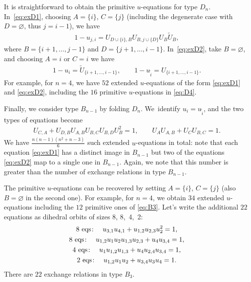 \documentclass[pdftex]{sigma}%
\numberwithin{equation}{section}
\begin{document}
It is straightforward to obtain the primitive $u$-equations for type $D_n$. In~\eqref{eq:exD1}, choosing $A=\{i\}$, $C=\{j\}$ (including the degenerate case with $D=\varnothing$, thus $j=i{-}1$), we have
\begin{gather*}
1-u_{j,i}=U_{D\cup \{i\}, B} U_{B, j\cup \{D\}} U_B \tilde {U}_B,
\end{gather*}
where $B=\{i{+}1, \dots, j{-}1\}$ and $D=\{j{+}1, \dots, i{-}1\}$. In~\eqref{eq:exD2}, take $B=\varnothing$, and choosing $A=i$ or $C=i$ we have
\begin{gather*}
1-u_i=\tilde{U}_{\{i{+}1, \dots, i{-}1\}},\qquad
1-{u}_{\tilde i}=U_{\{i{+}1, \dots, i{-}1\}}.
\end{gather*}
For example, for $n=4$, we have $52$ extended $u$-equations of the form \eqref{eq:exD1} and \eqref{eq:exD2}, including the $16$ primitive $u$-equations in \eqref{eq:D4}.

\medskip{}
Finally, we consider type $B_{n{-}1}$ by folding $D_n$. We~identify $u_i=u_{\tilde i}$, and the two types of equations become
\begin{gather*}%
U_{C,A}+U_{D,B} U_{A,B} U_{B,C} U_{B,D} U_B^2=1, \qquad
U_A U_{A,B}+U_C U_{B,C}=1.
\end{gather*}
We have $\frac{n(n{-}1)(n^2+n-3)}{6}$ such extended $u$-equations in total: note that each equation \eqref{eq:exD1} has a distinct image in $B_{n{-}1}$ but two of the equations \eqref{eq:exD2} map to a single one in $B_{n{-}1}$. Again, we note that this number is greater than the number of exchange relations in type $B_{n{-}1}$.

The primitive $u$-equations can be recovered by setting $A=\{i\}$, $C=\{j\}$ (also $B=\varnothing$ in the second one). For example, for $n=4$, we obtain $34$ extended $u$-equations including the $12$ primitive ones of \eqref{eq:B3}. Let's write the additional $22$ equations as dihedral orbits of sizes 8, 8,~4,~2:
\begin{gather*}
8~{\rm eqs}\colon \quad u_{3,1} u_{4,1}+u_{1,2} u_{2,3} u_2^2=1,%
\\
8~{\rm eqs}\colon \quad u_{1,2} u_1 u_2 u_{1,3} u_{2,3}+u_4 u_{3,4}=1,%
\\
4~{\rm eqs}\colon \quad u_1 u_{1,2} u_{1,3}+ u_4 u_{2,4} u_{3,4}=1,%
\\
2~{\rm eqs}\colon \quad u_{1,2} u_1 u_2+u_{3,4} u_3 u_4=1.%
\end{gather*}
There are $22$ exchange relations in type $B_3$.
\end{document}
